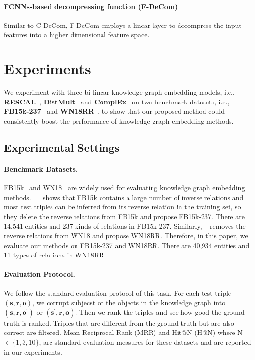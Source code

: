 \documentclass[letterpaper]{article} \usepackage{aaai20}  \usepackage{times}  \usepackage{helvet} \usepackage{courier}  \usepackage{booktabs}
\begin{document}
 \paragraph{FCNNs-based decompressing function (F-DeCom)}
  Similar to C-DeCom, F-DeCom employs a linear layer to decompress the input features into a higher dimensional feature space.








\section{Experiments}
We experiment with three bi-linear knowledge graph embedding models, i.e., \textbf{RESCAL}~\cite{nickel2011three}, \textbf{DistMult}~\cite{yang2014embedding} and \textbf{ComplEx}~\cite{trouillon2016complex} on two benchmark datasets, i.e., \textbf{FB15k-237}~\cite{toutanova2015observed} and \textbf{WN18RR}~\cite{dettmers2018convolutional}, to show that our proposed method could consistently boost the performance of knowledge graph embedding methods.
\subsection{Experimental Settings}
\paragraph{Benchmark Datasets.}
FB15k~\cite{bordes2013translating} and WN18~\cite{bordes2013translating} are widely used for evaluating knowledge graph embedding methods. ~\citeauthor{toutanova2015observed}~ shows that FB15k contains a large number of inverse relations and most test triples can be inferred from its reverse relation in the training set, so they delete the reverse relations from FB15k and propose FB15k-237. There are 14,541 entities and 237 kinds of relations in FB15k-237. Similarly, \citeauthor{dettmers2018convolutional}~ removes the reverse relations from WN18 and propose WN18RR. Therefore, in this paper, we evaluate our methods on FB15k-237 and WN18RR. There are 40,934 entities and 11 types of relations in WN18RR.
\paragraph{Evaluation Protocol.} We follow the standard evaluation protocol of this task. For each test triple $(\textbf{s}, \textbf{r}, \textbf{o})$, we corrupt subjecst or the objects in the knowledge graph into $(\textbf{s}, \textbf{r}, \textbf{o}^{'})$ or $(\textbf{s}^{'}, \textbf{r}, \textbf{o})$. Then we rank the triples and see how good the ground truth is ranked. Triples that are different from the ground truth but are also correct are filtered.
Mean Reciprocal Rank (MRR) and Hit@N (H@N) where N$\in\{1, 3, 10\}$, are standard evaluation measures
for these datasets and are reported in our experiments.
\end{document}
